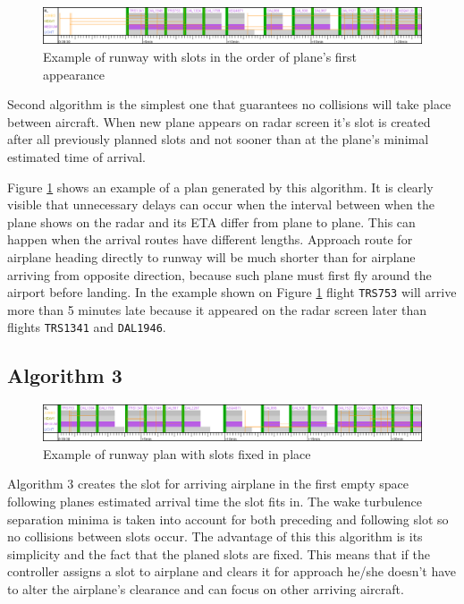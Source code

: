 \begin{figure}[h]
    \centering
    \includegraphics[width=\textwidth]{figures/rwy-end.png}
    \caption{Example of runway with slots in the order of plane's first appearance}
    \label{fig:rwy-end}
\end{figure}

Second algorithm is the simplest one that guarantees no collisions will take place between aircraft. When new plane appears on radar screen it's slot is created after all previously planned slots and not sooner than at the plane's minimal estimated time of arrival.

Figure \ref{fig:rwy-end} shows an example of a plan generated by this algorithm. It is clearly visible that unnecessary delays can occur when the interval between when the plane shows on the radar and its ETA differ from plane to plane. This can happen when the arrival routes have different lengths. Approach route for airplane heading directly to runway will be much shorter than for airplane arriving from opposite direction, because such plane must first fly around the airport before landing.  In the example shown on Figure \ref{fig:rwy-end} flight \texttt{TRS753} will arrive more than 5 minutes late because it appeared on the radar screen later than flights \texttt{TRS1341} and \texttt{DAL1946}.

\subsection{Algorithm 3}

\begin{figure}[h]
    \centering
    \includegraphics[width=\textwidth]{figures/rwy-fill-voids.png}
    \caption{Example of runway plan with slots fixed in place}
    \label{fig:rwy-fill-voids}
\end{figure}

Algorithm 3 creates the slot for arriving airplane in the first empty space following planes estimated arrival time the slot fits in. The wake turbulence separation minima is taken into account for both preceding and following slot so no collisions between slots occur. The advantage of this this algorithm is its simplicity and the fact that the planed slots are fixed. This means that if the controller assigns a slot to airplane and clears it for approach he/she doesn't have to alter the airplane's clearance and can focus on other arriving aircraft.

